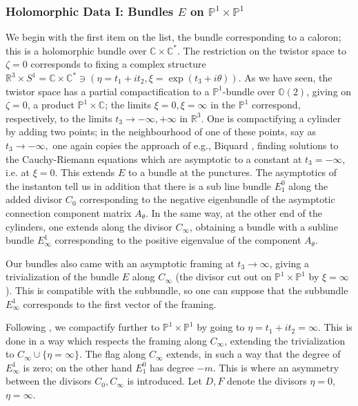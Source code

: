 \documentclass[12pt]{article}
\theoremstyle{definition}
\theoremstyle{remark}
\numberwithin{theorem}{section}
\def\bR{{\mathbb {R}}}
\def\bC{{\mathbb {C}}}
\def\bP{{\mathbb {P}}}
\def\bO{{\mathbb {O}}}
\begin{document}
\subsubsection{Holomorphic Data I: Bundles $E$ on $\bP^1\times \bP^1$}

We begin with the first item on the list, the bundle corresponding to a caloron; this is a holomorphic bundle over $\bC\times \bC^*$.
The restriction on the twistor space to $\zeta = 0$  corresponds to fixing a complex structure $\bR^3\times S^1 = \bC\times \bC^*\ni(\eta=t_1+i t_2,\xi=\exp(t_3+i\theta))$. As we have seen, the twistor space has a partial compactification to a $\bP^1$-bundle over $\bO(2)$, giving on  $\zeta = 0$, a product $\bP^1\times \bC$; the limits $\xi = 0, \xi =\infty $ in the $\bP^1$ correspond, respectively, to the limits $t_3\rightarrow -\infty, +\infty$ in $\bR^3$.  One is compactifying a cylinder by adding two points;  in the neighbourhood of one of these points, say as $t_3\rightarrow -\infty,$ one again copies the approach of e.g., Biquard \cite{Biquard91}, finding solutions to the Cauchy-Riemann equations which are asymptotic to a constant at $t_3= -\infty$, i.e. at $\xi=0$. This extends $E$ to a bundle at the punctures.  The asymptotics of the instanton tell us in addition that there is a sub line bundle $E^0_1$ along the added divisor $C_0$ corresponding to  the negative eigenbundle of the asymptotic connection component matrix  
$A_\theta$. In the same way, at the other end of the cylinders, one extends along the divisor $C_\infty$, obtaining a bundle with a subline bundle $E_\infty^1$ corresponding to the positive eigenvalue of the component $A_\theta.$


Our bundles also came with an asymptotic framing at $t_3\rightarrow \infty$, giving a   trivialization of the bundle $E$ along $C_\infty$ (the divisor cut out on $\bP^1\times \bP^1$ by $\xi = \infty$). This is compatible with the subbundle, so one can suppose that the subbundle $E_\infty^1$  corresponds to the first vector of the framing. 

Following \cite{Charbonneau:2006gu}, we compactify further to $\bP^1\times\bP^1$ by going to $\eta = t_1+ it_2 = \infty$. This is done in a way which respects the framing along $C_\infty$, extending the trivialization to $C_\infty\cup  \{\eta = \infty\}$. The flag along $C_\infty$ extends, in such a way that the degree of $E_\infty^1$ is zero; on the other hand $E^0_1$ has degree $-m$.  This is where an asymmetry between the divisors $C_0, C_\infty$ is introduced. Let $D , F$ denote the divisors $\eta= 0$, $\eta = \infty$.
\end{document}
